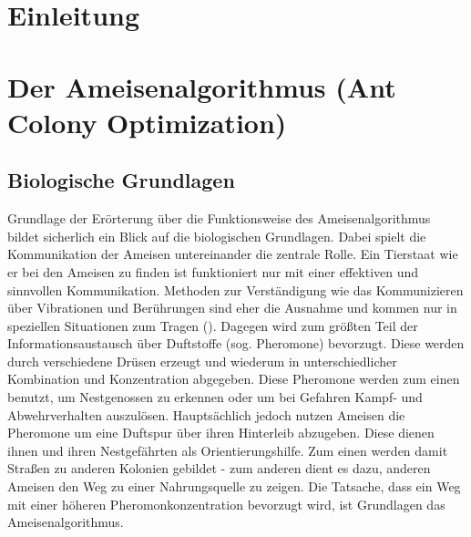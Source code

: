 \documentclass[doktyp=barbeit, sprache=german]{TUBAFarbeiten}
\begin{document}
\maketitle
\tableofcontents
\newpage
\section{Einleitung}
\section{Der Ameisenalgorithmus (Ant Colony Optimization)}
\subsection{Biologische Grundlagen}
Grundlage der Erörterung über die Funktionsweise des Ameisenalgorithmus bildet sicherlich ein Blick auf die biologischen Grundlagen. Dabei spielt die Kommunikation der Ameisen untereinander die zentrale Rolle. Ein Tierstaat wie er bei den Ameisen zu finden ist funktioniert nur mit einer effektiven und sinnvollen Kommunikation. Methoden zur Verständigung wie das Kommunizieren über Vibrationen und Berührungen sind eher die Ausnahme und kommen nur in speziellen Situationen zum Tragen (\cite{Ameisen}). Dagegen wird zum größten Teil der Informationsaustausch über Duftstoffe (sog. Pheromone) bevorzugt. Diese werden durch verschiedene Drüsen erzeugt und wiederum in unterschiedlicher Kombination und Konzentration abgegeben.
Diese Pheromone werden zum einen benutzt, um Nestgenossen zu erkennen oder um bei Gefahren Kampf- und Abwehrverhalten auszulösen. Hauptsächlich jedoch nutzen Ameisen die Pheromone um eine Duftspur über ihren Hinterleib abzugeben. Diese dienen ihnen und ihren Nestgefährten als Orientierungshilfe. Zum einen werden damit Straßen zu anderen Kolonien gebildet - zum anderen dient es dazu, anderen Ameisen den Weg zu einer Nahrungsquelle zu zeigen. Die Tatsache, dass ein Weg mit einer höheren Pheromonkonzentration bevorzugt wird, ist Grundlagen das Ameisenalgorithmus.
\end{document}
